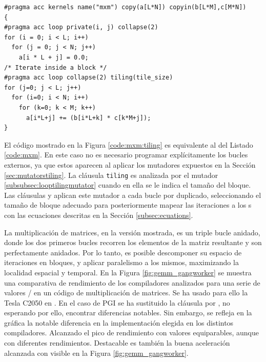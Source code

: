\begin{lstlisting}[caption={MxM por bloques usando \class{LoopTilingMutator}},label=code:mxm:tiling]
#pragma acc kernels name("mxm") copy(a[L*N]) copyin(b[L*M],c[M*N]) 
{
#pragma acc loop private(i, j) collapse(2)
for (i = 0; i < L; i++)
  for (j = 0; j < N; j++)
    a[i * L + j] = 0.0;
/* Iterate inside a block */
#pragma acc loop collapse(2) tiling(tile_size)
for (j=0; j < L; j++) 
  for (i=0; i < N; i++)
    for (k=0; k < M; k++)
      a[i*L+j] += (b[i*L+k] * c[k*M+j]);
}
\end{lstlisting}

El código mostrado en la Figura \ref{code:mxm:tiling}  es equivalente al del Listado 
\ref{code:mxm}. En este caso no es necesario programar explícitamente los bucles externos, 
ya que estos aparecen al aplicar los mutadores expuestos en la Sección 
\ref{sec:mutatorstiling}. La cláusula \texttt{tiling} es analizada por el mutador
 \ref{subsubsec:looptilingmutator} cuando en ella se le indica el 
tamaño del bloque. 
Las cláusulas \gang{} y \worker{} aplican este mutador a cada bucle por 
duplicado, seleccionando el tamaño de bloque adecuado para posteriormente
mapear las iteraciones a los \thread{}s con las ecuaciones descritas en la Sección 
\ref{subsec:ecuations}.





La multiplicación de matrices, en la versión mostrada, es un triple bucle anidado, donde
los dos primeros bucles recorren los elementos de la matriz resultante y son perfectamente 
anidados. Por lo tanto, es posible descomponer su espacio de iteraciones en bloques, y 
aplicar paralelismo a los mismos, maximizando la localidad espacial y temporal. 
En la Figura \ref{fig:gemm_gangworker} se muestra una comparativa de rendimiento de los 
compiladores analizados para una serie de valores \gang{}/\worker{} en un código de 
multiplicación de matrices. Se ha usado para ello la Tesla C2050 en \Garoe{}. En el caso 
de PGI se ha sustituido la cláusula \worker{} por \cvector{}, no esperando por ello, 
encontrar diferencias notables. Sin embargo, se refleja en la gráfica la notable 
diferencia en la implementación elegida en los distintos compiladores. Alcanzado el pico
de rendimiento con valores equiparables, aunque con diferentes rendimientos. Destacable es
también la buena aceleración alcanzada con \accULL{} visible en la Figura 
\ref{fig:gemm_gangworker}.

